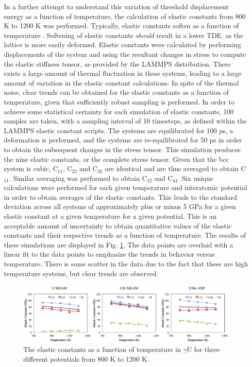 \documentclass[review]{elsarticle}
\begin{document}
\FloatBarrier

In a further attempt to understand this variation of threshold displacement energy as a function of temperature, the calculation of elastic constants from 800 K to 1200 K was performed. Typically, elastic constants soften as a function of temperature \cite{varshni1970}. Softening of elastic constants \textit{should} result in a lower TDE, as the lattice is more easily deformed. Elastic constants were calculated by performing displacements of the system and using the resultant changes in stress to compute the elastic stiffness tensor, as provided by the LAMMPS distribution. There exists a large amount of thermal fluctuation in these systems, leading to a large amount of variation in the elastic constant calculations. In spite of the thermal noise, clear trends can be obtained for the elastic constants as a function of temperature, given that sufficiently robust sampling is performed. In order to achieve some statistical certainty for each simulation of elastic constants, 100 samples are taken, with a sampling interval of 10 timesteps, as defined within the LAMMPS elastic constant scripts. The systems are equilibrated for 100 ps, a deformation is performed, and the systems are re-equilibrated for 50 ps in order to obtain the subsequent changes in the stress tensor. This simulation produces the nine elastic constants, or the complete stress tensor. Given that the bcc system is cubic, C$_{11}$, C$_{22}$ and C$_{33}$ are identical and are thus averaged to obtain C$_{11}$. Similar averaging was performed to obtain C$_{12}$ and C$_{44}$. Six unique calculations were performed for each given temperature and interatomic potential in order to obtain averages of the elastic constants. This leads to the standard deviation across all systems of approximately plus or minus 5 GPa for a given elastic constant at a given temperature for a given potential. This is an acceptable amount of uncertainty to obtain quantitative values of the elastic constants and their respective trends as a function of temperature. The results of these simulations are displayed in Fig. \ref{fig:elastic}. The data points are overlaid with a linear fit to the data points to emphasize the trends in behavior versus temperature. There is some scatter in the data due to the fact that these are high temperature systems, but clear trends are observed. 

\begin{figure}[h]
 \centering
 \includegraphics[width=\textwidth]{elastic_vs_T.png} 
 \caption{The elastic constants as a function of temperature in $\gamma$U for three different potentials from 800 K to 1200 K.}
 \label{fig:elastic}
\end{figure}
\end{document}

